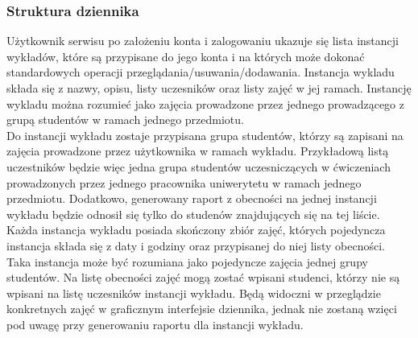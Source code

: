 \documentclass[declaration,shortabstract, mgr]{iithesis}
\begin{document}
\subsubsection{Struktura dziennika}
\indent Użytkownik serwisu po założeniu konta i zalogowaniu ukazuje się lista instancji wykładów, które są przypisane do jego konta i na których może dokonać standardowych operacji przeglądania/usuwania/dodawania. Instancja wykladu składa się z nazwy, opisu, listy uczesników oraz listy zajęć w jej ramach. Instancję wykladu można  rozumieć jako zajęcia prowadzone przez jednego prowadzącego z grupą studentów w ramach jednego przedmiotu. \\
\indent Do instancji wykładu zostaje przypisana grupa studentów, którzy są zapisani na zajęcia prowadzone przez użytkownika w ramach wykładu. Przykładową listą uczestników będzie więc jedna grupa studentów uczesniczących w ćwiczeniach prowadzonych przez jednego pracownika uniwerytetu w ramach jednego przedmiotu. Dodatkowo, generowany raport z obecności na jednej instancji wykładu będzie odnosił się tylko do studenów znajdujących się na tej liście.\\
\indent Każda instancja wykładu posiada skończony zbiór zajęć, których pojedyncza instancja składa się z daty i godziny oraz przypisanej do niej listy obecności. Taka instancja może być rozumiana jako pojedyncze zajęcia jednej grupy studentów. Na listę obecności zajęć mogą zostać wpisani studenci, którzy nie są wpisani na listę uczesników instancji wykładu. Będą widoczni w przeglądzie konkretnych zajęć w graficznym interfejsie dziennika, jednak nie zostaną wzięci pod uwagę przy generowaniu raportu dla instancji wykładu.\\
\end{document}
